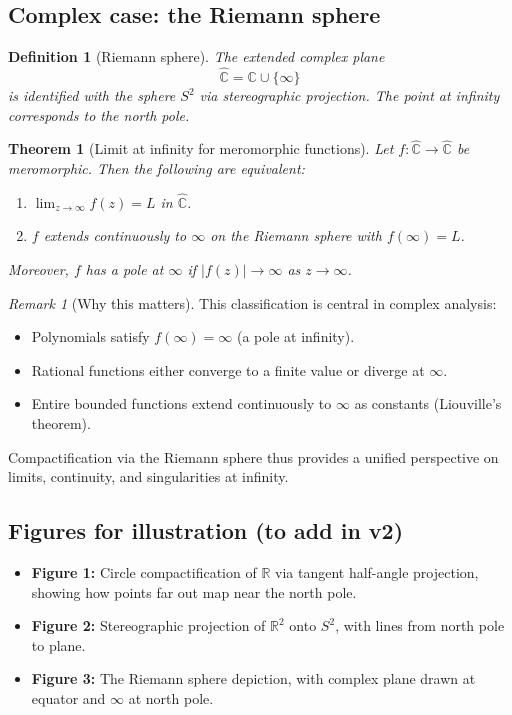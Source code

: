 \documentclass[12pt]{article}
\newtheorem{definition}{Definition}
\newtheorem{theorem}{Theorem}
\theoremstyle{remark}
\newtheorem*{remark}{Remark}
\begin{document}
\subsection{Complex case: the Riemann sphere}

\begin{definition}[Riemann sphere]
The extended complex plane 
\[
\hat{\mathbb{C}} = \mathbb{C}\cup\{\infty\}
\]
is identified with the sphere $S^2$ via stereographic projection. The point at 
infinity corresponds to the north pole. 
\end{definition}

\begin{theorem}[Limit at infinity for meromorphic functions]\label{thm:riemann-meromorphic}
Let $f:\hat{\mathbb{C}}\to\hat{\mathbb{C}}$ be meromorphic. Then the following 
are equivalent:
\begin{enumerate}
    \item $\lim_{z\to\infty} f(z)=L$ in $\hat{\mathbb{C}}$.
    \item $f$ extends continuously to $\infty$ on the Riemann sphere with 
    $f(\infty)=L$.
\end{enumerate}
Moreover, $f$ has a pole at $\infty$ if $|f(z)|\to\infty$ as $z\to\infty$.
\end{theorem}

\begin{remark}[Why this matters]
This classification is central in complex analysis:
\begin{itemize}
    \item Polynomials satisfy $f(\infty)=\infty$ (a pole at infinity).
    \item Rational functions either converge to a finite value or diverge at $\infty$.
    \item Entire bounded functions extend continuously to $\infty$ as constants 
    (Liouville’s theorem).
\end{itemize}
Compactification via the Riemann sphere thus provides a unified perspective on 
limits, continuity, and singularities at infinity.
\end{remark}

\subsection{Figures for illustration (to add in v2)}

\begin{itemize}
    \item \textbf{Figure 1:} Circle compactification of $\mathbb{R}$ via tangent 
    half-angle projection, showing how points far out map near the north pole.  
    \item \textbf{Figure 2:} Stereographic projection of $\mathbb{R}^2$ onto $S^2$, 
    with lines from north pole to plane.  
    \item \textbf{Figure 3:} The Riemann sphere depiction, with complex plane drawn 
    at equator and $\infty$ at north pole.  
\end{itemize}
\end{document}

